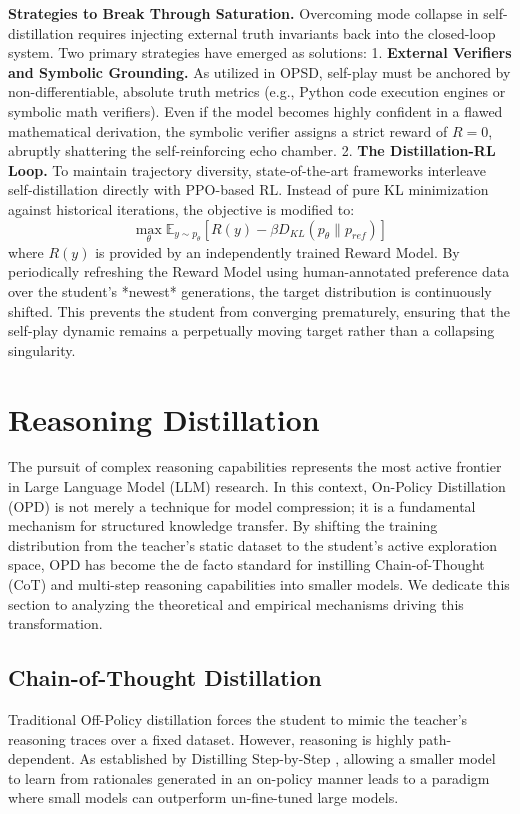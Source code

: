 \documentclass{article} %
\begin{document}
\textbf{Strategies to Break Through Saturation.} 
Overcoming mode collapse in self-distillation requires injecting external truth invariants back into the closed-loop system. Two primary strategies have emerged as solutions:
1. \textbf{External Verifiers and Symbolic Grounding.} As utilized in OPSD, self-play must be anchored by non-differentiable, absolute truth metrics (e.g., Python code execution engines or symbolic math verifiers). Even if the model becomes highly confident in a flawed mathematical derivation, the symbolic verifier assigns a strict reward of $R=0$, abruptly shattering the self-reinforcing echo chamber.
2. \textbf{The Distillation-RL Loop.} To maintain trajectory diversity, state-of-the-art frameworks interleave self-distillation directly with PPO-based RL. Instead of pure KL minimization against historical iterations, the objective is modified to:
\begin{equation}
    \max_\theta \mathbb{E}_{y \sim p_\theta} \left[ R(y) - \beta D_{KL}(p_\theta \parallel p_{ref}) \right]
\end{equation}
where $R(y)$ is provided by an independently trained Reward Model. By periodically refreshing the Reward Model using human-annotated preference data over the student's *newest* generations, the target distribution is continuously shifted. This prevents the student from converging prematurely, ensuring that the self-play dynamic remains a perpetually moving target rather than a collapsing singularity.


\section{Reasoning Distillation}
\label{sec:reasoning}

The pursuit of complex reasoning capabilities represents the most active frontier in Large Language Model (LLM) research. In this context, On-Policy Distillation (OPD) is not merely a technique for model compression; it is a fundamental mechanism for structured knowledge transfer. By shifting the training distribution from the teacher's static dataset to the student's active exploration space, OPD has become the de facto standard for instilling Chain-of-Thought (CoT) and multi-step reasoning capabilities into smaller models. We dedicate this section to analyzing the theoretical and empirical mechanisms driving this transformation.

\subsection{Chain-of-Thought Distillation}
Traditional Off-Policy distillation forces the student to mimic the teacher's reasoning traces over a fixed dataset. However, reasoning is highly path-dependent. As established by Distilling Step-by-Step \citep{2305.02301}, allowing a smaller model to learn from rationales generated in an on-policy manner leads to a paradigm where small models can outperform un-fine-tuned large models. 
\end{document}
